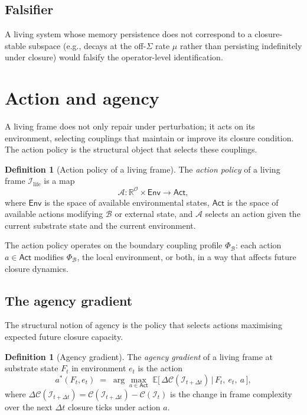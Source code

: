 \documentclass[11pt]{article}
\theoremstyle{plain}
\theoremstyle{definition}
\newtheorem{definition}[theorem]{Definition}
\theoremstyle{remark}
\newcommand{\Ical}{\mathcal{I}}
\newcommand{\Ocal}{\mathcal{O}}
\newcommand{\Ccal}{\mathcal{C}}
\newcommand{\Acal}{\mathcal{A}}
\newcommand{\Bcal}{\mathcal{B}}
\newcommand{\Ilife}{\Ical_{\mathrm{life}}}
\begin{document}
\subsection{Falsifier}

A living system whose memory persistence does not correspond to a closure-stable subspace (e.g., decays at the off-$\Sigma$ rate $\mu$ rather than persisting indefinitely under closure) would falsify the operator-level identification.

\section{Action and agency}\label{sec:action}

A living frame does not only repair under perturbation; it acts on its environment, selecting couplings that maintain or improve its closure condition. The action policy is the structural object that selects these couplings.

\begin{definition}[Action policy of a living frame]\label{def:action}
The \emph{action policy} of a living frame $\Ilife$ is a map
\[
  \Acal : \mathbb{R}^\Ocal \times \mathsf{Env} \to \mathsf{Act},
\]
where $\mathsf{Env}$ is the space of available environmental states, $\mathsf{Act}$ is the space of available actions modifying $\Bcal$ or external state, and $\Acal$ selects an action given the current substrate state and the current environment.
\end{definition}

The action policy operates on the boundary coupling profile $\Phi_\Bcal$: each action $a \in \mathsf{Act}$ modifies $\Phi_\Bcal$, the local environment, or both, in a way that affects future closure dynamics.

\subsection{The agency gradient}

The structural notion of agency is the policy that selects actions maximising expected future closure capacity.

\begin{definition}[Agency gradient]\label{def:agency}
The \emph{agency gradient} of a living frame at substrate state $F_t$ in environment $e_t$ is the action
\[
  a^*(F_t, e_t) \;=\; \arg\max_{a \in \mathsf{Act}}\; \mathbb{E}\big[\, \Delta \Ccal(\Ical_{t + \Delta t}) \,\big|\, F_t,\ e_t,\ a \,\big],
\]
where $\Delta \Ccal(\Ical_{t + \Delta t}) = \Ccal(\Ical_{t + \Delta t}) - \Ccal(\Ical_t)$ is the change in frame complexity over the next $\Delta t$ closure ticks under action $a$.
\end{definition}
\end{document}
